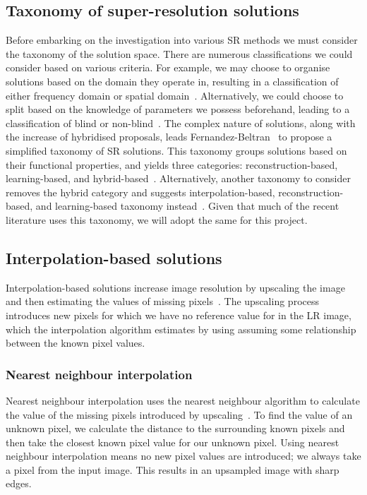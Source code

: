 \subsection{Taxonomy of super-resolution solutions}
Before embarking on the investigation into various SR methods we must consider the taxonomy of the solution space. There are numerous classifications we could consider based on various criteria. For example, we may choose to organise solutions based on the domain they operate in, resulting in a classification of either frequency domain or spatial domain~\cite{superResRemoteSensingOverview}. Alternatively, we could choose to split based on the knowledge of parameters we possess beforehand, leading to a classification of blind or non-blind~\cite{superResRemoteSensingOverview}. The complex nature of solutions, along with the increase of hybridised proposals, leads Fernandez-Beltran \etal\ to propose a simplified taxonomy of SR solutions. This taxonomy groups solutions based on their functional properties, and yields three categories: reconstruction-based, learning-based, and hybrid-based~\cite{superResRemoteSensingOverview}. Alternatively, another taxonomy to consider removes the hybrid category and suggests interpolation-based, reconstruction-based, and learning-based taxonomy instead~\cite{remoteSensingDeepLearningReview, remoteSensingGANsReview, isrgan, tesagan}. Given that much of the recent literature uses this taxonomy, we will adopt the same for this project.

\subsection{Interpolation-based solutions}
Interpolation-based solutions increase image resolution by upscaling the image and then estimating the values of missing pixels~\cite{interpolation}. The upscaling process introduces new pixels for which we have no reference value for in the LR image, which the interpolation algorithm estimates by using assuming some relationship between the known pixel values. 

\subsubsection{Nearest neighbour interpolation}
Nearest neighbour interpolation uses the nearest neighbour algorithm to calculate the value of the missing pixels introduced by upscaling~\cite{nnInterpolation}. To find the value of an unknown pixel, we calculate the distance to the surrounding known pixels and then take the closest known pixel value for our unknown pixel. Using nearest neighbour interpolation means no new pixel values are introduced; we always take a pixel from the input image. This results in an upsampled image with sharp edges.

